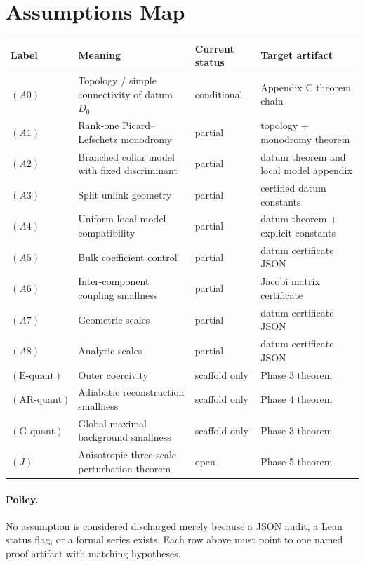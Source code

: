\section*{Assumptions Map}

\begin{center}
\begin{tabular}{|l|l|l|l|}
\hline
Label & Meaning & Current status & Target artifact \\
\hline
$(A0)$ & Topology / simple connectivity of datum $D_0$ & conditional & Appendix C theorem chain \\
\hline
$(A1)$ & Rank-one Picard--Lefschetz monodromy & partial & topology + monodromy theorem \\
\hline
$(A2)$ & Branched collar model with fixed discriminant & partial & datum theorem and local model appendix \\
\hline
$(A3)$ & Split unlink geometry & partial & certified datum constants \\
\hline
$(A4)$ & Uniform local model compatibility & partial & datum theorem + explicit constants \\
\hline
$(A5)$ & Bulk coefficient control & partial & datum certificate JSON \\
\hline
$(A6)$ & Inter-component coupling smallness & partial & Jacobi matrix certificate \\
\hline
$(A7)$ & Geometric scales & partial & datum certificate JSON \\
\hline
$(A8)$ & Analytic scales & partial & datum certificate JSON \\
\hline
$(\mathrm E\text{-quant})$ & Outer coercivity & scaffold only & Phase 3 theorem \\
\hline
$(\mathrm{AR}\text{-quant})$ & Adiabatic reconstruction smallness & scaffold only & Phase 4 theorem \\
\hline
$(\mathrm G\text{-quant})$ & Global maximal background smallness & scaffold only & Phase 3 theorem \\
\hline
$(J)$ & Anisotropic three-scale perturbation theorem & open & Phase 5 theorem \\
\hline
\end{tabular}
\end{center}

\paragraph{Policy.}
No assumption is considered discharged merely because a JSON audit, a Lean status flag,
or a formal series exists. Each row above must point to one named proof artifact with
matching hypotheses.

